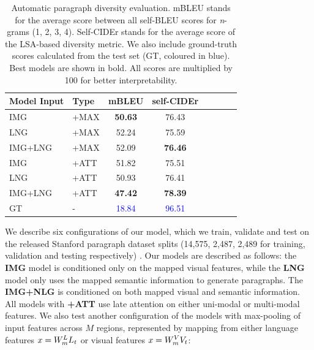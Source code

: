 \documentclass[11pt,a4paper]{article}
\begin{document}
\begin{table}[h]
  \footnotesize
 \centering
 \begin{tabular}{|l|l|c|c|c|c|c|c|}
 \hline
  \textbf{Model Input} & \textbf{Type} & \textbf{mBLEU} & \textbf{self-CIDEr} \\
 \hline
  IMG & +MAX & \cellcolor{red!30}\textbf{50.63} & \cellcolor{red!18}76.43 \\
 \hline
  LNG & +MAX & \cellcolor{red!10}52.24 & \cellcolor{red!10}75.59 \\
 \hline
  IMG+LNG & +MAX & \cellcolor{red!18}52.09 & \cellcolor{red!30}\textbf{76.46} \\
 \hline
 \hline
  IMG & +ATT & \cellcolor{red!10}51.82 & \cellcolor{red!10}75.51 \\
 \hline
  LNG & +ATT & \cellcolor{red!18}50.93 & \cellcolor{red!18}76.41 \\
 \hline
  IMG+LNG & +ATT & \cellcolor{red!30}\textbf{47.42} & \cellcolor{red!30}\textbf{78.39} \\
 \hline
 \hline
  GT & - & \textcolor{blue}{18.84} & \textcolor{blue}{96.51} \\
 \hline
 \end{tabular}
 \caption{Automatic paragraph diversity evaluation. mBLEU stands for the average score between all self-BLEU scores for \textit{n}-grams (1, 2, 3, 4). Self-CIDEr stands for the average score of the LSA-based diversity metric. We also include ground-truth scores calculated from the test set (GT, coloured in blue). Best models are shown in bold. All scores are multiplied by 100 for better interpretability.}
 \label{tab:divstats}
\end{table}

We describe six configurations of our model, which we train, validate and test on the released Stanford paragraph dataset splits (14,575, 2,487, 2,489 for training, validation and testing respectively) \cite{krause2016hierarchical}. %
Our models are described as follows: the \textbf{IMG} model is conditioned only on the mapped visual features, while the \textbf{LNG} model only uses the mapped semantic information to generate paragraphs.
The \textbf{IMG+NLG} is conditioned on both mapped visual and semantic information.
All models with \textbf{+ATT} use late attention on either uni-modal or multi-modal features. %
We also test another configuration of the models with max-pooling of input features across $M$ regions, represented by mapping from either language features $x=W_{m}\sp{L} L_t$ or visual features $x=W_{m}\sp{V} V_t$:
\end{document}
